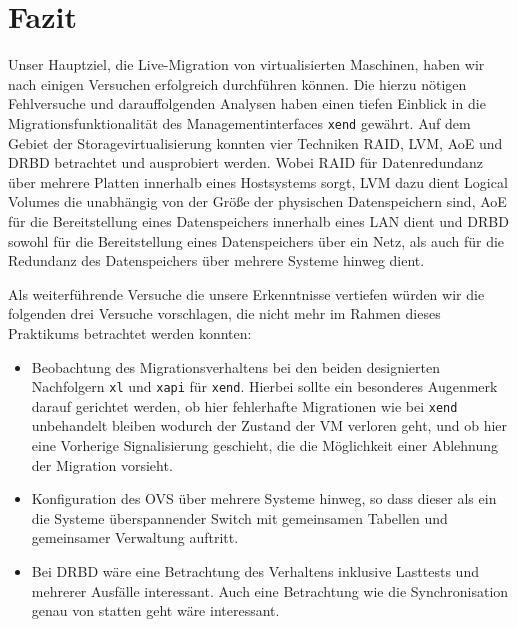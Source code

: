 \chapter{Fazit}
Unser Hauptziel, die Live-Migration von virtualisierten Maschinen, haben
wir nach einigen Versuchen erfolgreich durchführen können. Die hierzu nötigen Fehlversuche und darauffolgenden Analysen haben einen tiefen Einblick in die Migrationsfunktionalität des Managementinterfaces \verb#xend# gewährt.
Auf dem Gebiet der Storagevirtualisierung konnten vier Techniken RAID, LVM, AoE und DRBD betrachtet und ausprobiert werden. Wobei RAID für Datenredundanz über mehrere Platten innerhalb eines Hostsystems sorgt, LVM dazu dient Logical Volumes die unabhängig von der Größe der physischen Datenspeichern sind, AoE für die Bereitstellung eines Datenspeichers innerhalb eines LAN dient und DRBD sowohl für die Bereitstellung eines Datenspeichers über ein Netz, als auch für die Redundanz des Datenspeichers über mehrere Systeme hinweg dient.

Als weiterführende Versuche die unsere Erkenntnisse vertiefen würden wir die folgenden drei Versuche vorschlagen, die nicht mehr im Rahmen dieses Praktikums betrachtet werden konnten:
\begin{itemize}
	\item Beobachtung des Migrationsverhaltens bei den beiden designierten Nachfolgern \verb#xl# und \verb#xapi# für \verb#xend#. Hierbei sollte ein besonderes Augenmerk darauf gerichtet werden, ob hier fehlerhafte Migrationen wie bei \verb#xend# unbehandelt bleiben wodurch der Zustand der VM verloren geht, und ob hier eine Vorherige Signalisierung geschieht, die die Möglichkeit einer Ablehnung der Migration vorsieht.
	\item Konfiguration des OVS über mehrere Systeme hinweg, so dass dieser als ein die Systeme überspannender Switch mit gemeinsamen Tabellen und gemeinsamer Verwaltung auftritt.
	\item Bei DRBD wäre eine Betrachtung des Verhaltens inklusive Lasttests und mehrerer Ausfälle interessant. Auch eine Betrachtung wie die Synchronisation genau von statten geht wäre interessant.  
\end{itemize}

